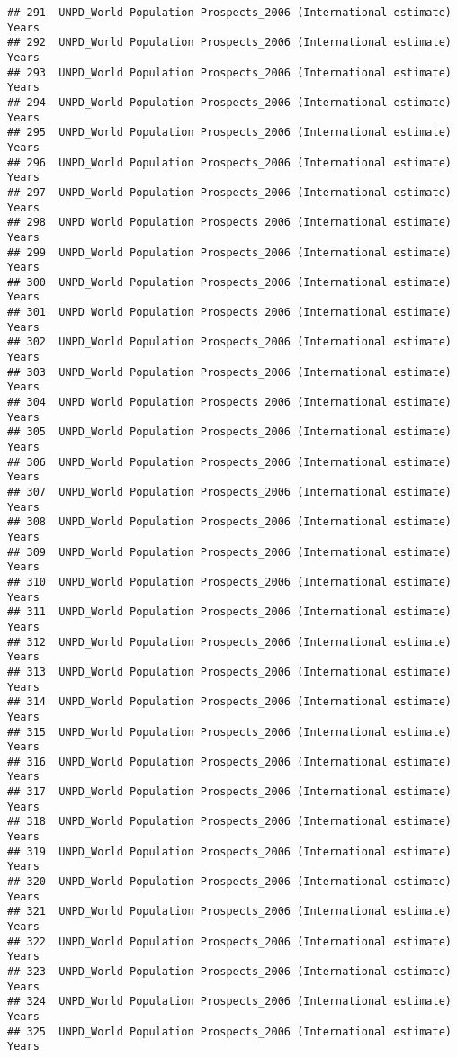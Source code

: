 \documentclass[]{article}
\begin{document}
\begin{verbatim}
## 291  UNPD_World Population Prospects_2006 (International estimate) Years
## 292  UNPD_World Population Prospects_2006 (International estimate) Years
## 293  UNPD_World Population Prospects_2006 (International estimate) Years
## 294  UNPD_World Population Prospects_2006 (International estimate) Years
## 295  UNPD_World Population Prospects_2006 (International estimate) Years
## 296  UNPD_World Population Prospects_2006 (International estimate) Years
## 297  UNPD_World Population Prospects_2006 (International estimate) Years
## 298  UNPD_World Population Prospects_2006 (International estimate) Years
## 299  UNPD_World Population Prospects_2006 (International estimate) Years
## 300  UNPD_World Population Prospects_2006 (International estimate) Years
## 301  UNPD_World Population Prospects_2006 (International estimate) Years
## 302  UNPD_World Population Prospects_2006 (International estimate) Years
## 303  UNPD_World Population Prospects_2006 (International estimate) Years
## 304  UNPD_World Population Prospects_2006 (International estimate) Years
## 305  UNPD_World Population Prospects_2006 (International estimate) Years
## 306  UNPD_World Population Prospects_2006 (International estimate) Years
## 307  UNPD_World Population Prospects_2006 (International estimate) Years
## 308  UNPD_World Population Prospects_2006 (International estimate) Years
## 309  UNPD_World Population Prospects_2006 (International estimate) Years
## 310  UNPD_World Population Prospects_2006 (International estimate) Years
## 311  UNPD_World Population Prospects_2006 (International estimate) Years
## 312  UNPD_World Population Prospects_2006 (International estimate) Years
## 313  UNPD_World Population Prospects_2006 (International estimate) Years
## 314  UNPD_World Population Prospects_2006 (International estimate) Years
## 315  UNPD_World Population Prospects_2006 (International estimate) Years
## 316  UNPD_World Population Prospects_2006 (International estimate) Years
## 317  UNPD_World Population Prospects_2006 (International estimate) Years
## 318  UNPD_World Population Prospects_2006 (International estimate) Years
## 319  UNPD_World Population Prospects_2006 (International estimate) Years
## 320  UNPD_World Population Prospects_2006 (International estimate) Years
## 321  UNPD_World Population Prospects_2006 (International estimate) Years
## 322  UNPD_World Population Prospects_2006 (International estimate) Years
## 323  UNPD_World Population Prospects_2006 (International estimate) Years
## 324  UNPD_World Population Prospects_2006 (International estimate) Years
## 325  UNPD_World Population Prospects_2006 (International estimate) Years

\end{verbatim}
\end{document}
